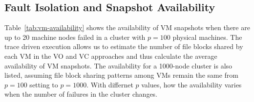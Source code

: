 \subsection{Fault Isolation and Snapshot Availability}

 Table~\ref{tab:vm-availability} shows the availability of VM snapshots when 
there are up to 20 machine nodes failed in a cluster with $p=100$ physical machines.
The trace driven execution allows us to estimate the number of file blocks shared by each VM in the VO and VC approaches
and thus calculate the average availability of VM snapshots.
The availability for  a 1000-node cluster is also listed, assuming file block sharing patterns among VMs remain
the same from $p=100$ setting to $p=1000$. With differnet $p$ values, how the availability varies when 
the number of failures in the cluster changes.




